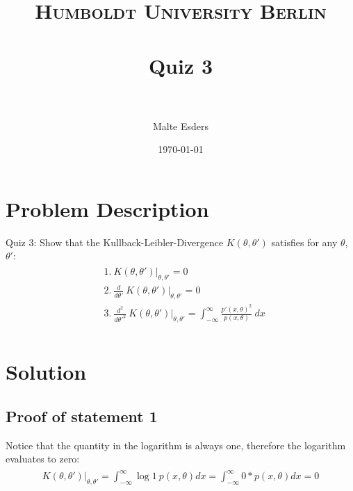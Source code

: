 \documentclass[paper=a4, fontsize=11pt]{scrartcl} %
\title{	
\normalfont \normalsize 
\textsc{Humboldt University Berlin} \\ [25pt] %
\horrule{0.5pt} \\[0.4cm] %
\huge Quiz 3 \\ %
\horrule{2pt} \\[0.5cm] %
}
\author{Malte Esders} %
\date{\normalsize\today} %
\numberwithin{equation}{section} %
\numberwithin{figure}{section} %
\numberwithin{table}{section} %
\begin{document}
\maketitle %

\section{Problem Description}
Quiz 3: Show that the Kullback-Leibler-Divergence $K(\theta,\theta')$ satisfies for any $\theta$, $\theta'$:
\begin{align} 
\begin{split}
	&1.\ K(\theta,\theta')|_{\theta,\theta'} = 0 \\
	&2.\ \frac{d}{d\theta'}\ K(\theta,\theta')|_{\theta,\theta'} = 0 \\
	&3.\ \frac{d^2}{d\theta'^2}\ K(\theta,\theta')|_{\theta,\theta'} = \int_{-\infty}^{\infty}{\frac{p'(x, \theta)^2}{p(x, \theta)}\ dx} \\
\end{split}					
\end{align}

\section{Solution}


\subsection{Proof of statement 1}
Notice that the quantity in the logarithm is always one, therefore the logarithm evaluates to zero:
\begin{align} 
\begin{split}
	K(\theta,\theta')|_{\theta,\theta'} = \int_{-\infty}^{\infty}{\log{1}\ p(x, \theta)dx} = \int_{-\infty}^{\infty}{0*p(x, \theta)dx} = 0
\end{split}					
\end{align}
\end{document}
